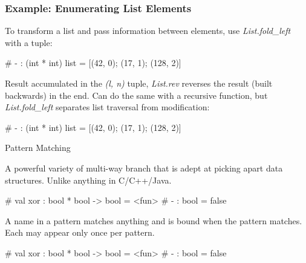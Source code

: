\documentclass{plt}
\begin{document}
\begin{frame}[fragile]
  \frametitle{Example: Enumerating List Elements}

To transform a list and pass information between elements, use
\emph{List.fold\_left} with a tuple:

\begin{interactive}
# 
- : (int * int) list = [(42, 0); (17, 1); (128, 2)]
\end{interactive}

Result accumulated in the \emph{(l, n)} tuple, \emph{List.rev}
reverses the result (built backwards) in the end.  Can do the same
with a recursive function, but \emph{List.fold\_left} separates list
traversal from modification:

\begin{interactive}
# 
- : (int * int) list = [(42, 0); (17, 1); (128, 2)]
\end{interactive}

\end{frame}

\begin{frame}[fragile]{Pattern Matching}

A powerful variety of multi-way branch that is adept at picking apart
data structures.  Unlike anything in C/C++/Java.

\begin{interactive}
# 
val xor : bool * bool -> bool = <fun>
# 
- : bool = false
\end{interactive}

\vspace{-0.5\baselineskip}

A name in a pattern matches anything and is bound when the pattern
matches.  Each may appear only once per pattern.

\begin{interactive}
# 
val xor : bool * bool -> bool = <fun>
# 
- : bool = false
\end{interactive}

\end{frame}
\end{document}
